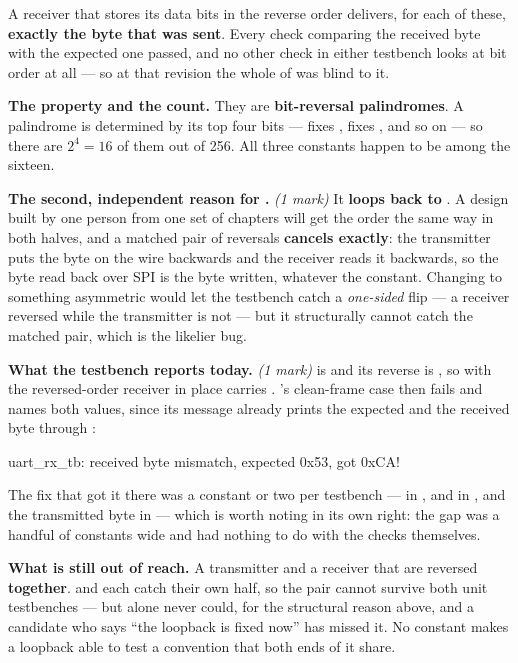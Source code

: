 A receiver that stores its data bits in the reverse order delivers, for each of these,
\textbf{exactly the byte that was sent}. Every check comparing the received byte with the expected
one passed, and no other check in either testbench looks at bit order at all --- so at that revision
the whole of  was blind to it.

\textbf{The property and the count.} They are \textbf{bit-reversal palindromes}. A palindrome is
determined by its top four bits ---  fixes ,  fixes , and so on
--- so there are $2^4 = 16$ of them out of 256. All three constants happen to be among the sixteen.

\textbf{The second, independent reason for .} \textit{(1 mark)} It \textbf{loops
 back to }. A design built by one person from one set of chapters will get the
order the same way in both halves, and a matched pair of reversals \textbf{cancels exactly}: the
transmitter puts the byte on the wire backwards and the receiver reads it backwards, so the byte read
back over SPI is the byte written, whatever the constant. Changing  to something
asymmetric would let the testbench catch a \emph{one-sided} flip --- a receiver reversed while the
transmitter is not --- but it structurally cannot catch the matched pair, which is the likelier bug.

\textbf{What the testbench reports today.} \textit{(1 mark)}  is  and its
reverse is , so with the reversed-order receiver in place  carries
\textbf{}. 's clean-frame case then fails and names both values, since
its message already prints the expected and the received byte through :

\begin{console}
uart_rx_tb: received byte mismatch, expected 0x53, got 0xCA!
\end{console}

\noindent The fix that got it there was a constant or two per testbench ---  in
,  and  in , and the transmitted byte
in  --- which is worth noting in its own right: the gap was a handful of constants
wide and had nothing to do with the checks themselves.

\textbf{What is still out of reach.} A transmitter and a receiver that are reversed
\textbf{together}.  and  each catch their own half, so the pair
cannot survive both unit testbenches --- but  alone never could, for the
structural reason above, and a candidate who says ``the loopback is fixed now'' has missed it. No
constant makes a loopback able to test a convention that both ends of it share.

